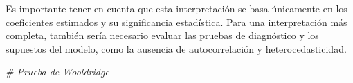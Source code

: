 \documentclass[
]{article}
\newenvironment{Shaded}{\begin{snugshade}}{\end{snugshade}}
\newcommand{\CommentTok}[1]{\textcolor[rgb]{0.56,0.35,0.01}{\textit{#1}}}
\begin{document}
Es importante tener en cuenta que esta interpretación se basa únicamente
en los coeficientes estimados y su significancia estadística. Para una
interpretación más completa, también sería necesario evaluar las pruebas
de diagnóstico y los supuestos del modelo, como la ausencia de
autocorrelación y heterocedasticidad.

\begin{Shaded}
\begin{Highlighting}[]
\CommentTok{\# Prueba de Wooldridge}
\end{Highlighting}
\end{Shaded}
\end{document}
